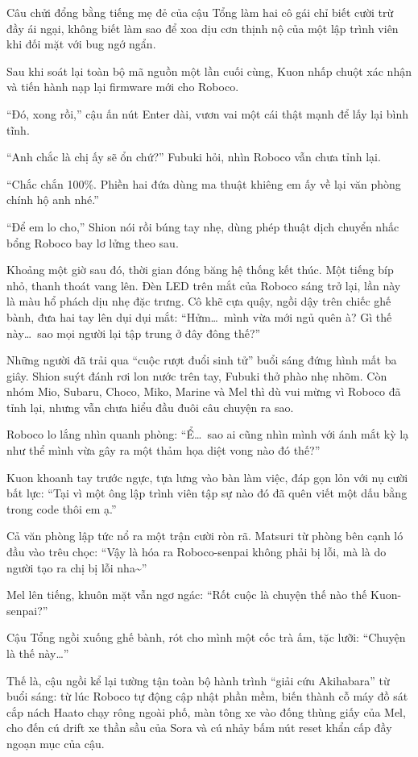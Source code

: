 \documentclass[../main.tex]{subfiles}
\begin{document}
Câu chửi đổng bằng tiếng mẹ đẻ của cậu Tổng làm hai cô gái chỉ biết cười trừ đầy ái ngại, không biết làm sao để xoa dịu cơn thịnh nộ của một lập trình viên khi đối mặt với bug ngớ ngẩn.

Sau khi soát lại toàn bộ mã nguồn một lần cuối cùng, Kuon nhấp chuột xác nhận và tiến hành nạp lại firmware mới cho Roboco.

``Đó, xong rồi,'' cậu ấn nút Enter dài, vươn vai một cái thật mạnh để lấy lại bình tĩnh.

``Anh chắc là chị ấy sẽ ổn chứ?'' Fubuki hỏi, nhìn Roboco vẫn chưa tỉnh lại.

``Chắc chắn 100\%. Phiền hai đứa dùng ma thuật khiêng em ấy về lại văn phòng chính hộ anh nhé.''

``Để em lo cho,'' Shion nói rồi búng tay nhẹ, dùng phép thuật dịch chuyển nhấc bổng Roboco bay lơ lửng theo sau.

Khoảng một giờ sau đó, thời gian đóng băng hệ thống kết thúc. Một tiếng bíp nhỏ, thanh thoát vang lên. Đèn LED trên mắt của Roboco sáng trở lại, lần này là màu hổ phách dịu nhẹ đặc trưng. Cô khẽ cựa quậy, ngồi dậy trên chiếc ghế bành, đưa hai tay lên dụi dụi mắt: ``Hửm\dots\ mình vừa mới ngủ quên à? Gì thế này\dots\ sao mọi người lại tập trung ở đây đông thế?''

Những người đã trải qua ``cuộc rượt đuổi sinh tử'' buổi sáng đứng hình mất ba giây. Shion suýt đánh rơi lon nước trên tay, Fubuki thở phào nhẹ nhõm. Còn nhóm Mio, Subaru, Choco, Miko, Marine và Mel thì dù vui mừng vì Roboco đã tỉnh lại, nhưng vẫn chưa hiểu đầu đuôi câu chuyện ra sao.

Roboco lo lắng nhìn quanh phòng: ``Ể\dots\ sao ai cũng nhìn mình với ánh mắt kỳ lạ như thể mình vừa gây ra một thảm họa diệt vong nào đó thế?''

Kuon khoanh tay trước ngực, tựa lưng vào bàn làm việc, đáp gọn lỏn với nụ cười bất lực: ``Tại vì một ông lập trình viên tập sự nào đó đã quên viết một dấu bằng trong code thôi em ạ.''

Cả văn phòng lập tức nổ ra một trận cười ròn rã. Matsuri từ phòng bên cạnh ló đầu vào trêu chọc: ``Vậy là hóa ra Roboco-senpai không phải bị lỗi, mà là do người tạo ra chị bị lỗi nha\~{}''

Mel lên tiếng, khuôn mặt vẫn ngơ ngác: ``Rốt cuộc là chuyện thế nào thế Kuon-senpai?''

Cậu Tổng ngồi xuống ghế bành, rót cho mình một cốc trà ấm, tặc lưỡi: ``Chuyện là thế này\dots''

Thế là, cậu ngồi kể lại tường tận toàn bộ hành trình ``giải cứu Akihabara'' từ buổi sáng: từ lúc Roboco tự động cập nhật phần mềm, biến thành cỗ máy đồ sát cắp nách Haato chạy rông ngoài phố, màn tông xe vào đống thùng giấy của Mel, cho đến cú drift xe thần sầu của Sora và cú nhảy bấm nút reset khẩn cấp đầy ngoạn mục của cậu.
\end{document}
